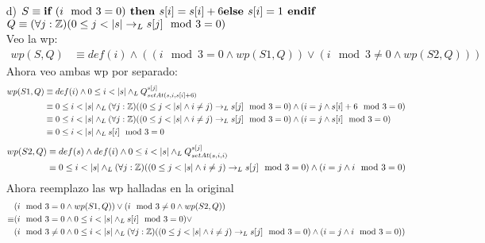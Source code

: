 \documentclass{article}
\begin{document}
{{\begin{itemize}
\begin{align}
        &\equiv 0\leq i<|s| \land (s[i]\neq 2^{i} \land_L 1\leq i<|s| \land (\forall j:\ent)((0\leq j < |s|\land i\neq j) \to_L s[j]=2^{j}))\lor\\\nonumber
        &( s[i]= 2^{i}\land_L (\forall j:\ent)((0< j < |s|) \to_L s[j]=2^{j}))
    \end{align}
    \item [d) ] $S\equiv \textbf{if }(i \mod 3=0)\textbf{ then } \\s[i]=s[i]+6\\ \textbf{else }\\s[i]=1\\ \textbf{ endif}$\\
    $Q\equiv (\forall j:\mathbb{Z})(0\leq j < |s| \to_L s[j] \mod 3 = 0)$\\
    Veo la wp:\\
    \setcounter{equation}{0}\begin{align}
        wp(S,Q)&\equiv def(i) \land ((i \mod 3=0 \land wp(S1,Q))\lor(i \mod 3\neq0 \land wp(S2,Q)))
    \end{align}
    \newpage
    Ahora veo ambas wp por separado:\\
    \setcounter{equation}{0}\begin{align}
        wp(S1,Q)&\equiv def(i)\land 0\leq i<|s| \land_L Q^{s[j]}_{setAt(s,i,s[i]+6)}\\
        &\equiv0\leq i<|s| \land_L (\forall j:\ent)((0\leq j < |s|\land i\neq j)\to_L s[j] \mod 3 = 0)\land(i=j\land s[i]+6 \mod 3=0 )\\
        &\equiv0\leq i<|s| \land_L (\forall j:\ent)((0\leq j < |s|\land i\neq j)\to_L s[j] \mod 3 = 0)\land(i=j\land s[i] \mod 3=0 )\\
        &\equiv0\leq i<|s| \land_L s[i] \mod 3=0 
    \end{align}
    \setcounter{equation}{0}\begin{align}
        wp(S2,Q)&\equiv def(s)\land def(i) \land 0\leq i <|s|\land_L Q^{s[j]}_{setAt(s,i,i)}\\
        &\equiv0\leq i<|s| \land_L (\forall j:\ent)((0\leq j < |s|\land i\neq j)\to_L s[j] \mod 3 = 0)\land(i=j\land i \mod 3=0 )
    \end{align}
    Ahora reemplazo las wp halladas en la original
    \setcounter{equation}{0}\begin{align}
        &(i \mod 3=0 \land wp(S1,Q))\lor(i \mod 3\neq0 \land wp(S2,Q))\\
        \equiv& (i \mod 3=0 \land 0\leq i<|s| \land_L s[i] \mod 3=0 )\lor\\\nonumber
        &(i \mod 3\neq0 \land0\leq i<|s| \land_L (\forall j:\ent)((0\leq j < |s|\land i\neq j)\to_L s[j] \mod 3 = 0)\land(i=j\land i \mod 3=0 ))\\

\end{align}
\end{itemize}}}
\end{document}
